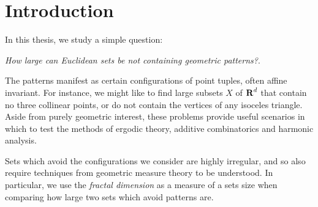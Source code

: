 
\chapter{Introduction}
\label{ch:Introduction}

In this thesis, we study a simple question:
%
\begin{center}
	{\it How large can Euclidean sets be not containing geometric patterns?}.
\end{center}
%
The patterns manifest as certain configurations of point tuples, often affine invariant. For instance, we might like to find large subsets $X$ of $\operatorname{\mathbf{R}}^d$ that contain no three collinear points, or do not contain the vertices of any isoceles triangle. Aside from purely geometric interest, these problems provide useful scenarios in which to test the methods of ergodic theory, additive combinatorics and harmonic analysis.

Sets which avoid the configurations we consider are highly irregular, and so also require techniques from geometric measure theory to be understood. In particular, we use the \emph{fractal dimension} as a measure of a sets size when comparing how large two sets which avoid patterns are.



